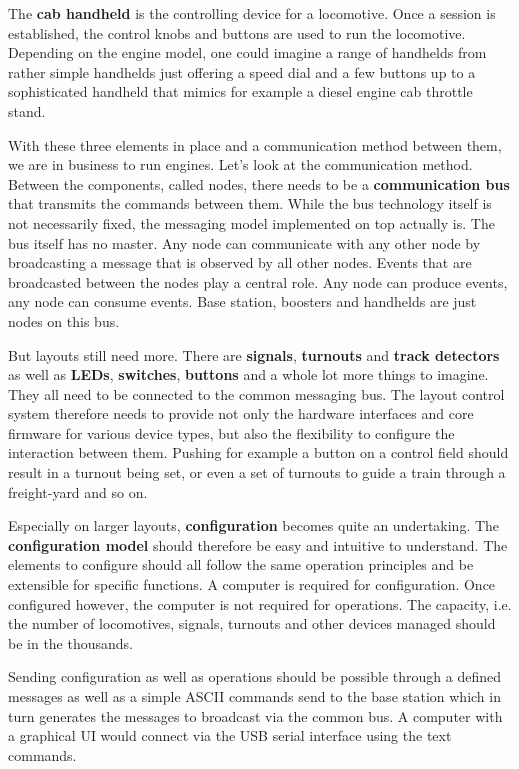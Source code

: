 The {\bf cab handheld} is the controlling device for a locomotive. Once a session is established, the control knobs and buttons are used to run the locomotive. Depending on the engine model, one could imagine a range of handhelds from rather simple handhelds just offering a speed dial and a few buttons up to a sophisticated handheld that mimics for example a diesel engine cab throttle stand.

With these three elements in place and a communication method between them, we are in business to run engines. Let's look at the communication method. Between the components, called nodes, there needs to be a {\bf communication bus} that transmits the commands between them. While the bus technology itself is not necessarily fixed, the messaging model implemented on top actually is. The bus itself has no master. Any node can communicate with any other node by broadcasting a message that is observed by all other nodes. Events that are broadcasted between the nodes play a central role. Any node can produce events, any node can consume events. Base station, boosters and handhelds are just nodes on this bus.

But layouts still need more. There are {\bf signals}, {\bf turnouts} and {\bf track detectors} as well as {\bf LEDs}, {\bf switches}, {\bf buttons} and a whole lot more things to imagine. They all need to be connected to the common messaging bus. The layout control system therefore needs to provide not only the hardware interfaces and core firmware for various device types, but also the flexibility to configure the interaction between them. Pushing for example a button on a control field should result in a turnout being set, or even a set of turnouts to guide a train through a freight-yard and so on.

Especially on larger layouts, {\bf configuration} becomes quite an undertaking. The {\bf configuration model} should therefore be easy and intuitive to understand. The elements to configure should all follow the same operation principles and be extensible for specific functions. A computer is required for configuration. Once configured however, the computer is not required for operations. The capacity, i.e. the number of locomotives, signals, turnouts and other devices managed should be in the thousands.

Sending configuration as well as operations should be possible through a defined messages as well as a simple ASCII commands send to the base station which in turn generates the messages to broadcast via the common bus. A computer with a graphical UI would connect via the USB serial interface using the text commands.

